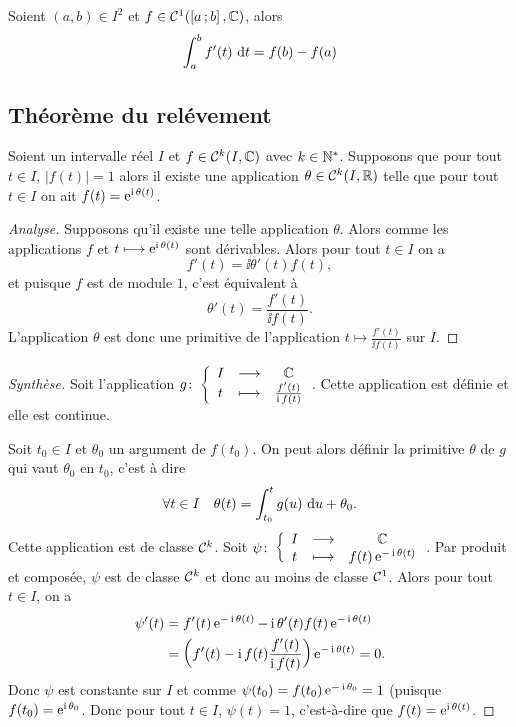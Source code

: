 \begin{cor}
  Soient \((a,b) \in I^2\) et \(f \in \mathcal{C}^{1}(\left[ a \, ; {} b \right],\mathbb{C})\), 
  alors
  \begin{equation}
    \int_a^b f'(t)\,\mathop{}\mathopen{}\mathrm{d} t = f(b)-f(a)
  \end{equation}
\end{cor}

\subsection{Théorème du relévement}

\begin{theo}
  Soient un intervalle réel \(I\) et \(f \in \mathcal{C}^{k}(I,\mathbb{C})\) avec \(k \in 
  \mathbb{N}^*\). Supposons que pour tout \(t \in I\), \(|f(t)| = 1\) alors il existe une 
  application \(\theta \in \mathcal{C}^{k}(I,\mathbb{R})\) telle que pour tout \(t \in I\) on 
  ait \(f(t) = \operatorname{e}^{\operatorname{i}\theta(t)}\).
\end{theo}

\begin{proof}[Analyse]
  Supposons qu'il existe une telle application \(\theta\). Alors comme les 
  applications \(f\) et \(t \longmapsto \operatorname{e}^{\operatorname{i}\theta(t)}\) sont dérivables. 
  Alors pour tout \(t\in I\) on a
  \begin{equation}
    f'(t) = \ii \theta'(t)f(t),
  \end{equation}
  et puisque \(f\) est de module \(1\), c'est équivalent à
  \begin{equation}
    \theta'(t) = \frac{f'(t)}{\ii f(t)}.
  \end{equation}
L'application \(\theta\) est donc une primitive de l'application \(t \longmapsto 
\frac{f'(t)}{\ii f(t)}\) sur \(I\). \end{proof}
\begin{proof}[Synthèse]
  Soit l'application \(g\colon\left\{\begin{array}{ccc}I & \longrightarrow &\mathbb{C}\\t & \longmapsto & \frac{f'(t)}{\operatorname{i} f(t)}\end{array}\right.\). Cette 
  application est définie et elle est continue.

  Soit \(t_0 \in I\) et \(\theta_0\) un argument de \(f(t_0)\). On peut alors 
  définir la primitive \(\theta\) de \(g\) qui vaut \(\theta_0\) en \(t_0\), 
  c'est à dire
  \begin{equation}
    \forall t \in I \quad \theta(t) = \int_{t_0}^t g(u)\,\mathop{}\mathopen{}\mathrm{d} u +\theta_0.
  \end{equation}
  Cette application est de classe \(\mathcal{C}^{k}\). Soit 
  \(\psi\colon\left\{\begin{array}{ccc}I & \longrightarrow &\mathbb{C}\\t & \longmapsto & f(t)\operatorname{e}^{-\operatorname{i}\theta(t)}\end{array}\right.\). Par produit et 
  composée, \(\psi\) est de classe \(\mathcal{C}^{k}\) et donc au moins de classe 
  \(\mathcal{C}^{1}\). Alors pour tout \(t \in I\), on a
  \begin{align*}
    \psi'(t) &= f'(t)\operatorname{e}^{-\operatorname{i} \theta(t)}-\operatorname{i} \theta'(t)f(t) \operatorname{e}^{-\operatorname{i}\theta(t)} 
    \\
    & = \left(f'(t)-\operatorname{i} f(t) \frac{f'(t)}{\operatorname{i} f(t)} \right)\operatorname{e}^{-\operatorname{i} \theta(t)} =0.
  \end{align*}
  Donc \(\psi\) est constante sur \(I\) et comme \(\psi(t_0) = f(t_0)\operatorname{e}^{-\operatorname{i} 
  \theta_0} = 1\) (puisque \(f(t_0) = \operatorname{e}^{\operatorname{i} \theta_0}\). Donc pour tout \(t \in 
  I\), \(\psi(t) = 1\), c'est-à-dire que \(f(t) = \operatorname{e}^{\operatorname{i} \theta(t)}\).
\end{proof}

